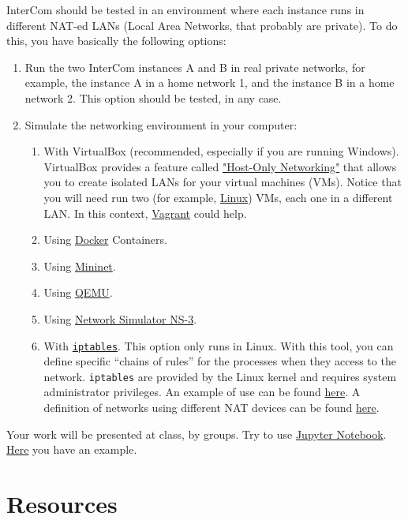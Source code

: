 InterCom should be tested in an environment where each instance
runs in different NAT-ed LANs (Local Area Networks, that probably are
private). To do this, you have basically the following options:
\begin{enumerate}
\item Run the two InterCom instances A and B in real private networks,
  for example, the instance A in a home network 1, and the instance B
  in a home network 2. This option should be tested, in any case.
\item Simulate the networking environment in your computer:
  \begin{enumerate}
  \item With VirtualBox (recommended, especially if you are running
    Windows). VirtualBox provides a feature called
    \href{https://www.virtualbox.org/manual/ch06.html#network_hostonly}{"Host-Only
      Networking"} that allows you to create isolated LANs for your
    virtual machines (VMs). Notice that you will need run two (for
    example, \href{https://xubuntu.org/download/}{Linux}) VMs, each
    one in a different LAN. In this context,
    \href{https://www.vagrantup.com/}{Vagrant} could help.
  \item Using \href{https://www.docker.com/}{Docker} Containers.
  \item Using \href{http://mininet.org/}{Mininet}.
  \item Using \href{https://www.qemu.org/}{QEMU}.
  \item Using \href{https://www.nsnam.org/}{Network Simulator NS-3}.
  \item With
    \href{https://en.wikipedia.org/wiki/Iptables}{\texttt{iptables}}. This
    option only runs in Linux. With this tool, you can define specific
    ``chains of rules'' for the processes when they access to the
    network. \texttt{iptables} are provided by the Linux kernel and
    requires system administrator privileges. An example of use can be
    found
    \href{https://github.com/P2PSP/console/blob/master/src/setup_NAT_network.sh}{here}. A
    definition of networks using different NAT devices can be found
    \href{https://github.com/P2PSP/core/tree/master/doc/NTS/iptables}{here}.
  \end{enumerate}
\end{enumerate}

Your work will be presented at class, by groups. Try to use
\href{https://jupyter.org/}{Jupyter
  Notebook}. \href{https://github.com/Tecnologias-multimedia/InterCom/blob/master/docs/2-hours_seminar.ipynb}{Here}
you have an example.

\section{Resources}


